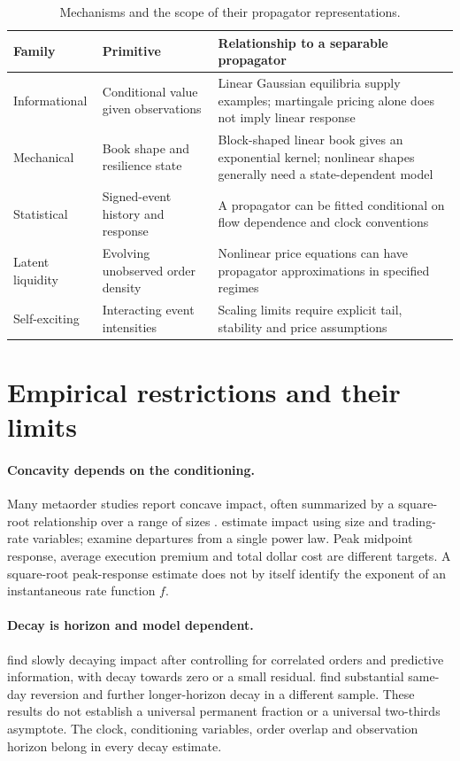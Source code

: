 \documentclass[11pt]{article}
\numberwithin{equation}{section}
\theoremstyle{definition}
\theoremstyle{remark}
\theoremstyle{definition}
\begin{document}
\begin{table}[tb]
\centering\small
\begin{tabularx}{\textwidth}{p{}YY}
\toprule Family & Primitive & Relationship to a separable propagator \\
\midrule
Informational & Conditional value given observations & Linear Gaussian equilibria supply examples; martingale pricing alone does not imply linear response \\
Mechanical & Book shape and resilience state & Block-shaped linear book gives an exponential kernel; nonlinear shapes generally need a state-dependent model \\
Statistical & Signed-event history and response & A propagator can be fitted conditional on flow dependence and clock conventions \\
Latent liquidity & Evolving unobserved order density & Nonlinear price equations can have propagator approximations in specified regimes \\
Self-exciting & Interacting event intensities & Scaling limits require explicit tail, stability and price assumptions \\
\bottomrule
\end{tabularx}
\caption{Mechanisms and the scope of their propagator representations.}
\label{tab:families}
\end{table}

\section{Empirical restrictions and their limits}\label{sec:empirics}

\paragraph{Concavity depends on the conditioning.}
Many metaorder studies report concave impact, often summarized by a square-root
relationship over a range of sizes \citep{toth2011,bershova2013}.
\citet{almgren2005} estimate impact using size and trading-rate variables;
\citet{zarinelli2015} examine departures from a single power law. Peak midpoint
response, average execution premium and total dollar cost are different targets.
A square-root peak-response estimate does not by itself identify the exponent of
an instantaneous rate function $f$.

\paragraph{Decay is horizon and model dependent.}
\citet{brokmann2015} find slowly decaying impact after controlling for correlated
orders and predictive information, with decay towards zero or a small residual.
\citet{bucci2018} find substantial same-day reversion and further longer-horizon
decay in a different sample. These results do not establish a universal permanent
fraction or a universal two-thirds asymptote. The clock, conditioning variables,
order overlap and observation horizon belong in every decay estimate.
\end{document}
